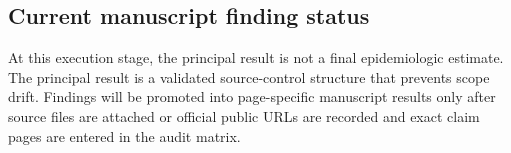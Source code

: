 \subsection{Current manuscript finding status}

At this execution stage, the principal result is not a final epidemiologic estimate. The principal result is a validated source-control structure that prevents scope drift. Findings will be promoted into page-specific manuscript results only after source files are attached or official public URLs are recorded and exact claim pages are entered in the audit matrix.

